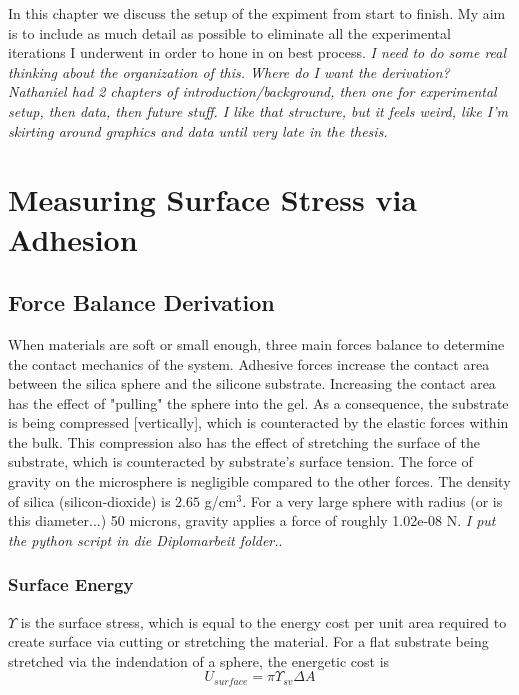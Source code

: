 In this chapter we discuss the setup of the expiment from start to finish. My aim is to include as much detail as possible to eliminate all the experimental iterations I underwent in order to hone in on best process. \emph{I need to do some real thinking about the organization of this. Where do I want the derivation? Nathaniel had 2 chapters of introduction/background, then one for experimental setup, then data, then future stuff. I like that structure, but it feels weird, like I'm skirting around graphics and data until very late in the thesis.}


\section{Measuring Surface Stress via Adhesion}

\subsection{Force Balance Derivation}
When materials are soft or small enough, three main forces balance to determine the contact mechanics of the system. Adhesive forces increase the contact area between the silica sphere and the silicone substrate. Increasing the contact area has the effect of "pulling" the sphere into the gel. As a consequence, the substrate is being compressed [vertically], which is counteracted by the elastic forces within the bulk. This compression also has the effect of stretching the surface of the substrate, which is counteracted by substrate's surface tension. The force of gravity on the microsphere is negligible compared to the other forces. The density of silica (silicon-dioxide) is $2.65$ g/cm$^3$. For a very large sphere with radius (or is this diameter...) 50 microns, gravity applies a force of roughly 1.02e-08 N. \emph{I put the python script in die Diplomarbeit folder.}.

\subsubsection{Surface Energy}
$\Upsilon$ is the surface stress, which is equal to the energy cost per unit area required to create surface via cutting or stretching the material. For a flat substrate being stretched via the indendation of a sphere, the energetic cost is
\begin{equation}
\label{generic_surface_energy}
U_{surface} = \pi \Upsilon_{sv}\Delta A
\end{equation}

